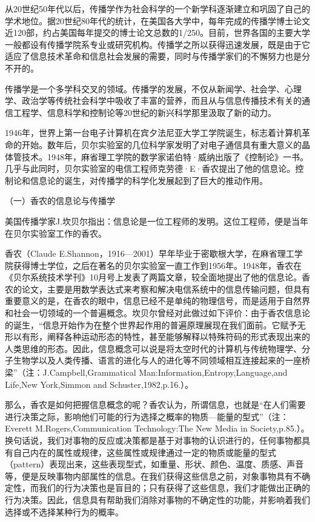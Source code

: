 \documentclass[UTF8,12pt]{ctexart}
\numberwithin{equation}{section} %
\numberwithin{figure}{section}
\numberwithin{table}{section}
\begin{document}
	从20世纪50年代以后，传播学作为社会科学的一个新学科逐渐建立和巩固了自己的学术地位。据20世纪80年代的统计，在美国各大学中，每年完成的传播学博士论文近120部，约占美国每年提交的博士论文总数的1/250。目前，世界各国的主要大学一般都设有传播学院系专业或研究机构。传播学之所以获得迅速发展，既是由于它适应了信息技术革命和信息社会发展的需要，同时与传播学家们的不懈努力也是分不开的。
	
	
	传播学是一个多学科交叉的领域。传播学的发展，不仅从新闻学、社会学、心理学、政治学等传统社会科学中吸收了丰富的营养，而且从与信息传播技术有关的通信工程学、信息科学和控制论等20世纪的新兴科学那里汲取了新的动力。
	
	1946年，世界上第一台电子计算机在宾夕法尼亚大学工学院诞生，标志着计算机革命的开始。数年后，贝尔实验室的几位科学家发明了对电子通信具有重大意义的晶体管技术。1948年，麻省理工学院的数学家诺伯特·威纳出版了《控制论》一书。几乎与此同时，贝尔实验室的电信工程师克劳德·E·香农提出了他的信息论。控制论和信息论的诞生，对传播学的科学化发展起到了巨大的推动作用。
	
	（一）香农的信息论与传播学
	
	美国传播学家J.坎贝尔指出：信息论是一位工程师的发明。这位工程师，便是当年在贝尔实验室工作的香农。
	
	香农（Claude E.Shannon，1916—2001）早年毕业于密歇根大学，在麻省理工学院获得博士学位，之后在著名的贝尔实验室一直工作到1956年。1948年，香农在《贝尔系统技术学刊》10月号上发表了两篇文章，较全面地提出了他的信息论。香农的论文，主要是用数学表达式来考察和解决电信系统中的信息传输问题，但具有重要意义的是，在香农的眼中，信息已经不是单纯的物理信号，而是适用于自然界和社会一切领域的一个普遍概念。坎贝尔曾经对此做过如下评价：由于香农信息论的诞生，“信息开始作为在整个世界起作用的普遍原理展现在我们面前。它赋予无形以有形，阐释各种运动形态的特性，甚至能够解释以特殊符码的形式表现出来的人类思维的形态。因此，信息概念可以说是将太空时代的计算机与传统物理学、分子生物学以及人类传播、语言的进化与人的进化等不同领域相互连接起来的一座桥梁”（注：J.Campbell,Grammatical Man:Information,Entropy,Language,and Life,New York,Simmon and Schuster,1982,p.16.）。
	
	那么，香农是如何把握信息概念的呢？香农认为，所谓信息，也就是“在人们需要进行决策之际，影响他们可能的行为选择之概率的物质—能量的型式”（注：Everett M.Rogers,Communication Technology:The New Media in Society,p.85.）。换句话说，我们对事物的反应或决策都是基于对事物的认识进行的，任何事物都具有自己内在的属性或规律，这些属性或规律通过一定的物质或能量的型式（pattern）表现出来，这些表现型式，如重量、形状、颜色、温度、质感、声音等，便是反映事物内部属性的信息。在我们获得这些信息之前，对象事物具有不确定性，而我们的行为决策也是盲目的；只有获得了这些信息，我们才能做出正确的行为决策。因此，信息具有帮助我们消除对事物的不确定性的功能，并影响着我们选择或不选择某种行为的概率。
	
\end{document}
